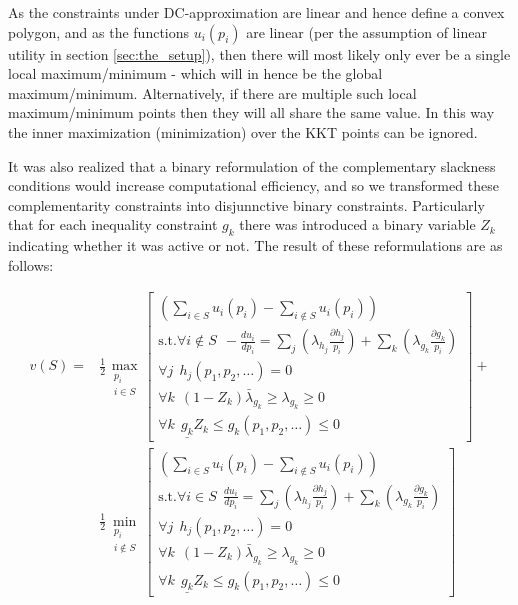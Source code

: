 As the constraints under DC-approximation are linear and hence define a convex polygon,
and as the functions $u_i(p_i)$ are linear (per the assumption of linear utility in section \ref{sec:the_setup}), then there will most likely only ever be a single local maximum/minimum - which will in hence be the global maximum/minimum.
Alternatively, if there are multiple such local maximum/minimum points then they will all share the same value.
In this way the inner maximization (minimization) over the KKT points can be ignored.

It was also realized that a binary reformulation of the complementary slackness conditions would increase computational efficiency, and so we transformed these complementarity constraints into disjunnctive binary constraints.
Particularly that for each inequality constraint $g_k$ there was introduced a binary variable $Z_k$ indicating whether it was active or not.
The result of these reformulations are as follows:

\begin{equation}
\label{optimization_eq1}
\begin{aligned}
v(S) =&\frac{1}{2} 
\max_{\substack{p_i \\ i\in S}}\left[\substack{
	\left(\sum_{i\in S}u_i(p_i) - \sum_{i\notin S}u_i(p_i)\right)\\
	\text{s.t.}\forall i\notin S~~-\frac{d u_i}{d p_i}=\sum_j(\lambda_{h_j}\frac{\partial h_j}{p_i}) + \sum_k(\lambda_{g_k}\frac{\partial g_k}{p_i})\\
	\forall j~~ h_j(p_1,p_2,\dots)=0\\
	\forall k~~ (1-Z_k)\bar{\lambda}_{g_k} \ge \lambda_{g_k} \ge 0\\
	\forall k~~ \underline{g_k}Z_k\le g_k(p_1,p_2,\dots) \le 0}
\right] +\\
&\frac{1}{2}\min_{\substack{p_i \\ i\notin S}}\left[\substack{
	\left(\sum_{i\in S}u_i(p_i) - \sum_{i\notin S}u_i(p_i)\right)\\
	\text{s.t.}\forall i\in S~~\frac{d u_i}{d p_i}=\sum_j(\lambda_{h_j}\frac{\partial h_j}{p_i}) + \sum_k(\lambda_{g_k}\frac{\partial g_k}{p_i})\\
	\forall j~~ h_j(p_1,p_2,\dots)=0\\
	\forall k~~ (1-Z_k)\bar{\lambda}_{g_k} \ge \lambda_{g_k} \ge 0\\
	\forall k~~ \underline{g_k}Z_k\le g_k(p_1,p_2,\dots) \le 0}
\right]
\end{aligned}
\end{equation}

